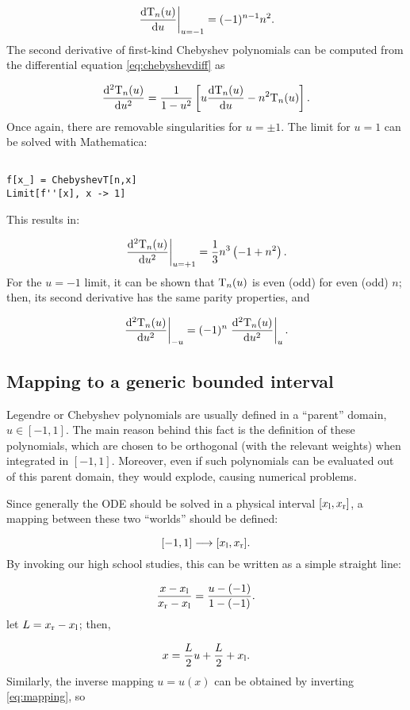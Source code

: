 \documentclass[a4paper,12pt]{article}
\begin{document}
\[
\left. \frac{\mathrm{d} \mathrm{T}_n(u)}{\mathrm{d} u} \right|_{u=-1} = (-1)^{n-1} n^2.
\]
The second derivative of first-kind Chebyshev polynomials can be computed from the differential equation \eqref{eq:chebyshevdiff} as

\[
\frac{\mathrm{d}^2 \mathrm{T}_n(u)}{\mathrm{d} u^2} = \frac{1}{1-u^2} \left[ u \frac{\mathrm{d} \mathrm{T}_n(u)}{\mathrm{d} u} - n^2 \mathrm{T}_n(u) \right].
\]
Once again, there are removable singularities for $u=\pm 1$. The limit for $u=1$ can be solved with Mathematica:

\begin{verbatim}

f[x_] = ChebyshevT[n,x]
Limit[f''[x], x -> 1]

\end{verbatim}
This results in:

\[
\left. \frac{\mathrm{d}^2 \mathrm{T}_n(u)}{\mathrm{d} u^2} \right|_{u=+1} = \frac{1}{3} n^3 \left( - 1 + n^2 \right).
\]
For the $u=-1$ limit, it can be shown that $\mathrm{T}_n(u)$ is even (odd) for even (odd) $n$; then, its second derivative has the same parity properties, and

\[
\left. \frac{\mathrm{d}^2 \mathrm{T}_n(u)}{\mathrm{d} u^2} \right|_{-u} = (-1)^n \left. \frac{\mathrm{d}^2 \mathrm{T}_n(u)}{\mathrm{d} u^2} \right|_{u}.
\]

\subsection{Mapping to a generic bounded interval}
\label{sect:mapping}

Legendre or Chebyshev polynomials are usually defined in a ``parent'' domain, $u \in [-1,1]$. The main reason behind this fact is the definition of these polynomials, which are chosen to be orthogonal (with the relevant weights) when integrated in $[-1,1]$. Moreover, even if such polynomials can be evaluated out of this parent domain, they would explode, causing numerical problems.

Since generally the ODE should be solved in a physical interval $[x_{\mathrm{l}},x_{\mathrm{r}}]$, a mapping between these two ``worlds'' should be defined:

\[
[-1,1] \longrightarrow [x_{\mathrm{l}}, x_{\mathrm{r}}].
\]
By invoking our high school studies, this can be written as a simple straight line:

\[
\frac{x - x_{\mathrm{l}}}{x_{\mathrm{r}}-x_{\mathrm{l}}} = \frac{u-(-1)}{1-(-1)}.
\]
let $L = x_{\mathrm{r}} - x_{\mathrm{l}}$; then, 

\begin{equation}
x = \frac{L}{2} u + \frac{L}{2} + x_{\mathrm{l}}.
\label{eq:mapping}
\end{equation}
Similarly, the inverse mapping $u = u(x)$ can be obtained by inverting \eqref{eq:mapping}, so
\end{document}
